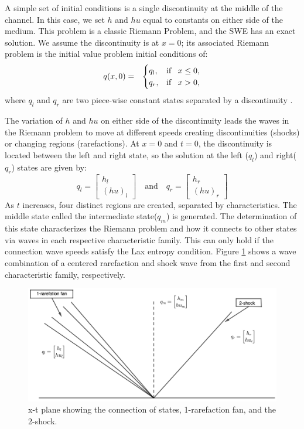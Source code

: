 \documentclass[11pt,a4paper]{article}
\begin{document}
	A simple set of initial conditions is a single discontinuity at the middle of the channel.  In this case, we set $h$ and $hu$ equal to constants on either side of the medium.  This problem is a classic Riemann Problem, and the SWE has an exact solution.  We assume the discontinuity is at $x = 0$; its associated Riemann problem is the initial value problem initial conditions of:
		\begin{eqnarray}
		q(x,0)& =& \begin{cases}
			q_{l}, & \text{if \, $x \le 0,$}\\
			q_{r},& \text{if \, $x > 0,$}\\
			
		\end{cases}  
		\label{rp1}     
	\end{eqnarray}
where $q_{l}$ and $q_{r}$ are two piece-wise constant states separated by a discontinuity \cite{ba-le-mi-ro:2003}. 

	The variation of $h$ and $hu$ on either side of the discontinuity leads the waves in the Riemann problem to move at different speeds creating discontinuities (shocks) or changing regions (rarefactions)\cite{leveque2002finite}.  At $x = 0$ and $t = 0$,   the discontinuity is located between the left and right state, so the solution at the left ($q_{l}$) and right($q_{r}$) states are given by: 
	\begin{equation}
		q_{l} = \begin{bmatrix}
			h_{l} \\( hu)_{l}
		\end{bmatrix}  \quad \text{and} \quad q_{r} = \begin{bmatrix}
			h_{r} \\( hu)_{r}
		\end{bmatrix} 
		\label{ic}
	\end{equation}
	As $t$ increases, four distinct regions are created, separated by characteristics. The middle state called the intermediate state($q_{m}$) is generated.  The determination of this state characterizes the Riemann problem and how it connects to other states via waves in each respective characteristic family\cite{ba-le-mi-ro:2003}.  This can only hold if the connection wave speeds satisfy the Lax entropy condition. Figure \ref{fig:x-tplane} shows a wave combination of a centered rarefaction and shock wave from the first and second characteristic family, respectively.
	
	\begin{figure}[H]
		\centering
		\includegraphics[width=0.5\linewidth]{images/geo1}
		\caption{ x-t plane showing the connection of states, 1-rarefaction fan, and the 2-shock.}
		\label{fig:x-tplane}
	\end{figure}
\end{document}
